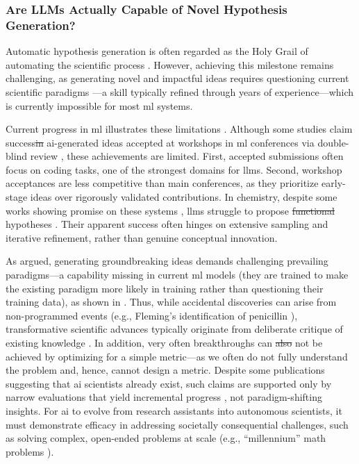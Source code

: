\documentclass[11pt, oneside]{article}
\makeatletter
\providecommand{\DIFaddtex}[1]{{\protect\color{blue}\uwave{#1}}} %
\providecommand{\DIFdeltex}[1]{{\protect\color{red}\sout{#1}}} %
\providecommand{\DIFaddbegin}{} %
\providecommand{\DIFaddend}{} %
\providecommand{\DIFdelbegin}{} %
\providecommand{\DIFdelend}{} %
\providecommand{\DIFadd}[1]{\texorpdfstring{\DIFaddtex{#1}}{#1}} %
\providecommand{\DIFdel}[1]{\texorpdfstring{\DIFdeltex{#1}}{}} %
\newcommand{\DIFscaledelfig}{0.5}
\newlength{\DIFdelgraphicswidth} %
\newlength{\DIFdelgraphicsheight} %
\newcommand{\DIFaddincludegraphics}[2][]{{\color{blue}\fbox{\DIFOincludegraphics[#1]{#2}}}} %
\newcommand{\DIFdelincludegraphics}[2][]{%
\sbox{\DIFdelgraphicsbox}{\DIFOincludegraphics[#1]{#2}}%
\settoboxwidth{\DIFdelgraphicswidth}{\DIFdelgraphicsbox} %
\settoboxtotalheight{\DIFdelgraphicsheight}{\DIFdelgraphicsbox} %
\scalebox{\DIFscaledelfig}{%
\parbox[b]{\DIFdelgraphicswidth}{\usebox{\DIFdelgraphicsbox}\\[-\baselineskip] \rule{\DIFdelgraphicswidth}{0em}}\llap{\resizebox{\DIFdelgraphicswidth}{\DIFdelgraphicsheight}{%
\setlength{\unitlength}{\DIFdelgraphicswidth}%
\begin{picture}(1,1)%
\thicklines\linethickness{2pt} %
{\color[rgb]{1,0,0}\put(0,0){\framebox(1,1){}}}%
{\color[rgb]{1,0,0}\put(0,0){\line( 1,1){1}}}%
{\color[rgb]{1,0,0}\put(0,1){\line(1,-1){1}}}%
\end{picture}%
}\hspace*{3pt}}} %
} %
\DeclareRobustCommand{\DIFaddbegin}{\DIFOaddbegin \let\includegraphics\DIFaddincludegraphics} %
\DeclareRobustCommand{\DIFaddend}{\DIFOaddend \let\includegraphics\DIFOincludegraphics} %
\DeclareRobustCommand{\DIFdelbegin}{\DIFOdelbegin \let\includegraphics\DIFdelincludegraphics} %
\DeclareRobustCommand{\DIFdelend}{\DIFOaddend \let\includegraphics\DIFOincludegraphics} %
\let\sout@orig\sout %
\renewcommand{\sout}[1]{\ifmmode\text{\sout@orig{\ensuremath{#1}}}\else\sout@orig{#1}\fi} %
\makeatother
\begin{document}
\subsubsection{Are LLMs Actually Capable of Novel Hypothesis Generation?}

Automatic hypothesis generation is often regarded as the Holy Grail of automating the scientific process \autocite{coley2020autonomous}. However, achieving this milestone remains challenging, as generating novel and impactful ideas requires questioning current scientific paradigms \autocite{Kuhn1962Structure}---a skill typically refined through years of experience---which is currently impossible for most \gls{ml} systems.

Current progress in \gls{ml} illustrates these limitations \autocite{kon2025exp0bench0, gu2024interesting}. Although some studies claim success\DIFdelbegin \DIFdel{in }\DIFdelend \DIFaddbegin \DIFadd{, as }\DIFaddend \gls{ai}-generated ideas \DIFaddbegin \DIFadd{being }\DIFaddend accepted at workshops in \gls{ml} conferences via double-blind review \autocite{zhou2025tempest0}, these achievements are limited. 
First, accepted submissions often focus on coding tasks, one of the strongest domains for \glspl{llm}. Second, workshop acceptances are less competitive than main conferences, as they prioritize early-stage ideas over rigorously validated contributions. 
In chemistry, despite some works showing promise on these systems \autocite{yang2025moose0chem20}, \glspl{llm} struggle to propose \DIFdelbegin \DIFdel{functional }\DIFdelend \DIFaddbegin \DIFadd{innovative }\DIFaddend hypotheses \autocite{si2025ideation1execution}.
Their apparent success often hinges on extensive sampling and iterative refinement, rather than genuine conceptual innovation.

As \textcite{Kuhn1962Structure} argued, generating groundbreaking ideas demands challenging prevailing paradigms---a capability missing in current \gls{ml} models (they are trained to make the existing paradigm more likely in training rather than questioning their training data), as shown in . 
Thus, while accidental discoveries can arise from non-programmed events (e.g., Fleming’s identification of penicillin \autocite{Fleming1929antibacterial, Fleming1945penicillin}), transformative scientific advances typically originate from deliberate critique of existing knowledge \autocite{popper1959logic, Lakatos1970falsification}. In addition, very often breakthroughs can \DIFdelbegin \DIFdel{also }\DIFdelend not be achieved by optimizing for a simple metric---as we often do not fully understand the problem and, hence, cannot design a metric.\autocite{stanley2015greatness}
Despite some publications suggesting that \gls{ai} scientists already exist, such claims are supported only by narrow evaluations that yield incremental progress \autocite{novikov2025alphaevolve}, not paradigm-shifting insights. For \gls{ai} to evolve from research assistants into autonomous scientists, it must demonstrate efficacy in addressing societally consequential challenges, such as solving complex, open-ended problems at scale (e.g., \enquote{millennium} math problems
\autocite{Carlson2006millennium}).
\end{document}
